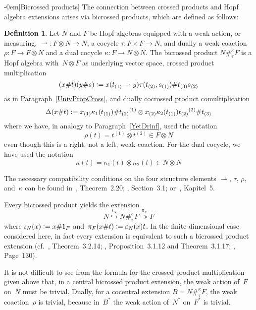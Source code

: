 \documentclass{article}
\makeatletter
\renewcommand{\subsection}{\@startsection{subsection}{2}{0em}%
{\baselineskip}{-0em}{\bfseries\normalsize}}
\numberwithin{equation}{section}
\theoremstyle{definition}
\newtheorem*{defn}{Definition}
\theoremstyle{break}
\newcommand{\ot}{\mathbin{\otimes}}
\newcommand{\deq}{\vcentcolon =}
\newcommand{\1}{{(1)}}
\newcommand{\2}{{(2)}}
\newcommand{\3}{{(3)}}
\makeatother
\begin{document}
\subsection[Bicrossed products]{} \label{Bicross}
The connection between crossed products and Hopf algebra extensions arises via bicrossed products, which are defined as follows:
\begin{defn}
Let $N$ and $F$ be Hopf algebras equipped with a weak action, or measuring,
$\rightharpoonup \colon F\ot N\rightarrow N$, a cocycle $\tau \colon F \times F \rightarrow N$, and dually a weak coaction $\rho \colon F \rightarrow F \ot N$ and a dual cocycle
$\kappa \colon F \rightarrow N \ot N$. The bicrossed product $N \#_{\tau}^{\kappa} F$ is a Hopf algebra with~$N \ot F$ as underlying vector space, crossed product multiplication
\[(x \# t) (y \# s) \deq x (t_{\1} \rightharpoonup y) \tau(t_{\2}, s_{\1}) \# t_{\3} s_{\2} \]
as in Paragraph~\ref{UnivPropCross}, and dually cocrossed product comultiplication
\[\Delta (x\# t) \deq
x_{\1} \kappa_1(t_{\1}) \# t_{\2}{}^{\1}
\ot x_{\2} \kappa_2(t_{\1}) t_{\2}{}^{\2} \# t_{\3}\]
where we have, in analogy to Paragraph~\ref{YetDrinf}, used the notation
\[\rho(t) = t^{\1} \ot t^{\2} \in F \ot N \]
even though this is a right, not a left, weak coaction. For the dual cocycle, we have used the notation
\[\kappa(t) = \kappa_{1}(t) \ot \kappa_{2}(t) \in N \ot N\]
\end{defn}

The necessary compatibility conditions on the four structure elements $\rightharpoonup$, $\tau$, $\rho$, and~$\kappa$ can be found in~\cite{AD}, Theorem~2.20; \cite{AndNot}, Section~3.1; or~\cite{HofstDiss}, Kapitel~5.

Every bicrossed product yields the extension
\begin{equation*}
N \overset{\iota_N}{\hookrightarrow} N \#_{\tau}^{\kappa} F
\overset{\pi_F}{\twoheadrightarrow} F
\end{equation*}
where $\iota_N(x) \deq x \# 1_F$ and~$\pi_F(x \# t) \deq \varepsilon_N(x) t$. In the finite-dimensional case considered here, in fact every extension is equivalent to such a bicrossed product extension (cf.~\cite{AD}, Theorem~3.2.14; \cite{AndNot}, Proposition~3.1.12 and Theorem~3.1.17; \cite{MaQu}, Page~130).

It is not difficult to see from the formula for the crossed product multiplication given above that, in a central bicrossed product extension, the weak action of~$F$ on~$N$ must be trivial. Dually, for a cocentral extension $B = N \#_{\tau}^{\kappa} F$,
the weak coaction~$\rho$ is trivial, because in~$B^*$ the weak action of~$N^*$ on~$F^*$ is trivial.
\end{document}
